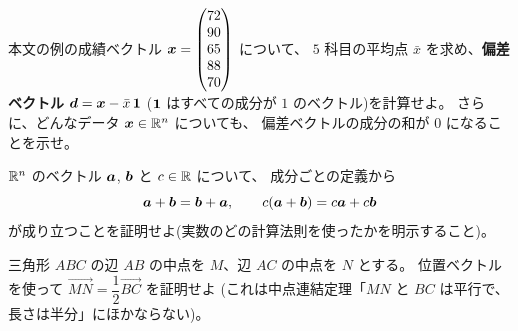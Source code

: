 \begin{mondai}[発展]\label{q:vec-ex10}
本文の例の成績ベクトル $\bm{x} = \begin{pmatrix}72 \\ 90 \\ 65 \\ 88 \\ 70\end{pmatrix}$ について、
$5$ 科目の平均点 $\bar{x}$ を求め、\textbf{偏差ベクトル}
$\bm{d} = \bm{x} - \bar{x}\,\bm{1}$
($\bm{1}$ はすべての成分が $1$ のベクトル)を計算せよ。
さらに、どんなデータ $\bm{x} \in \mathbb{R}^n$ についても、
偏差ベクトルの成分の和が $0$ になることを示せ。
\end{mondai}

\begin{mondai}[証明]\label{q:vec-ex11}
$\mathbb{R}^n$ のベクトル $\bm{a}$, $\bm{b}$ と $c \in \mathbb{R}$ について、
成分ごとの定義から
\[
\bm{a} + \bm{b} = \bm{b} + \bm{a}, \qquad
c(\bm{a} + \bm{b}) = c\bm{a} + c\bm{b}
\]
が成り立つことを証明せよ(実数のどの計算法則を使ったかを明示すること)。
\end{mondai}

\begin{mondai}[証明]\label{q:vec-ex12}
三角形 $ABC$ の辺 $AB$ の中点を $M$、辺 $AC$ の中点を $N$ とする。
位置ベクトルを使って
$\overrightarrow{MN} = \dfrac{1}{2}\overrightarrow{BC}$ を証明せよ
(これは中点連結定理「$MN$ と $BC$ は平行で、長さは半分」にほかならない)。
\end{mondai}


